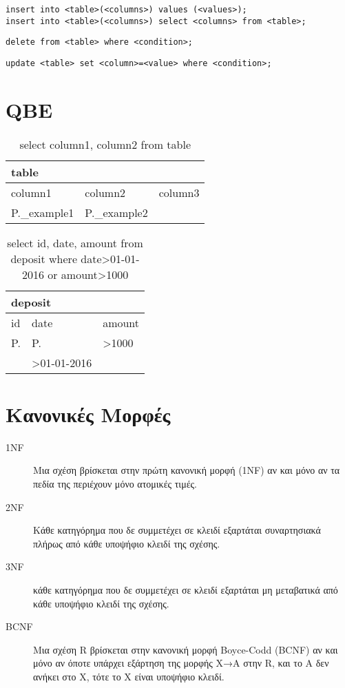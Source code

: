 \begin{lstlisting}[caption=insert examples]
insert into <table>(<columns>) values (<values>);
insert into <table>(<columns>) select <columns> from <table>;
\end{lstlisting}

\begin{lstlisting}[caption=delete example]
delete from <table> where <condition>;
\end{lstlisting}

\begin{lstlisting}[caption=update]
update <table> set <column>=<value> where <condition>;
\end{lstlisting}

\section{QBE}

\begin{table}[H]
	\centering
	\caption{select column1, column2 from table}
	\begin{tabularx}{0.9\textwidth}{|X|X|X|}
		\hline
		\multicolumn{3}{|X|}{table} \\
		\hline
		column1 & column2 & column3 \\
		\hline
		P.\_example1 & P.\_example2 & {} \\
		\hline
	\end{tabularx}
\end{table}


\begin{table}[H]
	\centering
	\caption{select id, date, amount from deposit where date>01-01-2016 or amount>1000}
	\begin{tabularx}{0.9\textwidth}{|X|X|X|}
		\hline
		\multicolumn{3}{|X|}{deposit} \\
		\hline
		id & date & amount \\
		\hline
		{P.} & {P.} & {>1000} \\
		\hline
		{} & {>01-01-2016} & {} \\
		\hline
	\end{tabularx}
\end{table}


\section{Κανονικές Μορφές}

\begin{description}
	\item[1NF]	Μια σχέση βρίσκεται στην πρώτη κανονική μορφή (1NF) αν και μόνο αν 
			τα πεδία της περιέχουν μόνο ατομικές τιμές.
	\item[2NF]	Κάθε κατηγόρημα που δε συμμετέχει σε κλειδί εξαρτάται συναρτησιακά πλήρως 
			από κάθε υποψήφιο κλειδί της σχέσης.
	\item[3NF]	κάθε κατηγόρημα που δε συμμετέχει σε κλειδί εξαρτάται 
			μη μεταβατικά από κάθε υποψήφιο κλειδί της σχέσης.
	\item[BCNF]	Μια σχέση R βρίσκεται στην κανονική μορφή Boyce-Codd (BCNF) αν και μόνο αν 
			όποτε υπάρχει εξάρτηση της μορφής Χ→Α στην R, και το Α δεν ανήκει στο Χ, 
			τότε το Χ είναι υποψήφιο κλειδί.
\end{description}

